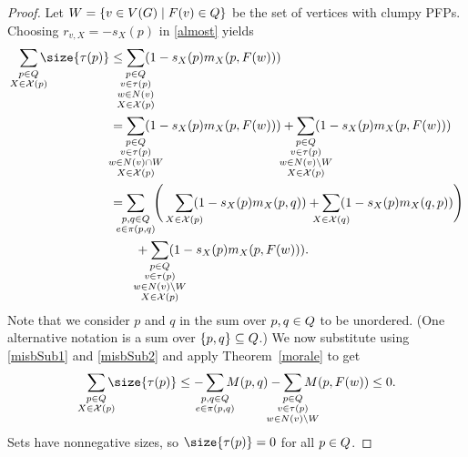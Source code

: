 \begin{proof}
Let $W = \set{v \in \V}{\pfp{v} \in \cpfps}$ be the set of vertices with clumpy
PFPs. Choosing $r_{v,X} = -s_X(p)$ in \eqref{almost} yields
\begin{align*}
  \smashoperator[r]{\sum_{\substack{
        p \in \cpfps \\
        X \in \sctr{p}
      }}}\size{\pfpverts{p}}
  &\leq
  \smashoperator{\sum_{\substack{
        p \in \cpfps \\ v \in \pfpverts{p} \\
        w \in \N{v} \\ X \in \sctr{p}
      }}}(1-s_X(p)\misb{X}{p}{\pfp{w}}) \\
  &=
  \smashoperator{\sum_{\substack{
        p \in \cpfps \\ v \in \pfpverts{p} \\
        w \in \N{v} \cap W \\ X \in \sctr{p}
      }}}(1-s_X(p)\misb{X}{p}{\pfp{w}}) +
  \smashoperator{\sum_{\substack{
        p \in \cpfps \\ v \in \pfpverts{p} \\
        w \in \N{v} \setminus W \\ X \in \sctr{p}
      }}}(1-s_X(p)\misb{X}{p}{\pfp{w}}) \\
  &=
  \smashoperator[l]{\sum_{\substack{
        p,q \in \cpfps \\
        e \in \pfpedges{p}{q}
      }}}\!\!
  \Bigg(\smashoperator[r]{\sum_{X \in \sctr{p}}}(1-s_X(p)\misb{X}{p}{q})
  + \smashoperator{\sum_{X \in \sctr{q}}}(1-s_X(p)\misb{X}{q}{p})\Bigg)
  \\ &\qquad +
  \smashoperator{\sum_{\substack{
        p \in \cpfps \\ v \in \pfpverts{p} \\
        w \in \N{v} \setminus W \\ X \in \sctr{p}
      }}}(1-s_X(p)\misb{X}{p}{\pfp{w}}). \\
\end{align*}
Note that we consider $p$ and $q$ in the sum over $p,q \in \cpfps$ to be
unordered. (One alternative notation is a sum over $\{p,q\} \subseteq \cpfps$.)
We now substitute using \eqref{misbSub1} and \eqref{misbSub2} and apply
Theorem~\ref{morale} to get
\[
  \smashoperator[r]{\sum_{\substack{
        p \in \cpfps \\
        X \in \sctr{p}
      }}}\size{\pfpverts{p}}
  \leq
  -\smashoperator{\sum_{\substack{
        p,q \in \cpfps \\
        e \in \pfpedges{p}{q}
      }}}M(p,q) -
  \smashoperator{\sum_{\substack{
        p \in \cpfps \\
        v \in \pfpverts{p} \\ w \in \N{v} \setminus W
      }}}M(p,F(w))
  \leq 0.
\]
Sets have nonnegative sizes, so $\size{\pfpverts{p}} = 0$ for all $p \in
\cpfps$.
\end{proof}
